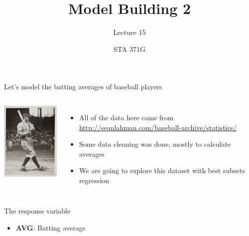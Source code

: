 \documentclass{beamer}\usepackage[]{graphicx}\usepackage[]{color}
\title{Model Building 2}
\subtitle{Lecture 15}
\author{STA 371G}
\begin{document}
  
  

  \frame{\maketitle}



  \begin{darkframes}
    
    \begin{frame}{Let's model the batting averages of baseball players}
      \begin{columns}[onlytextwidth]
          \includegraphics[width=1.6in]{TyCobb.png}
        
          \begin{itemize}
            \item All of the data here came from \url{http://seanlahman.com/baseball-archive/statistics/}
            \item Some data cleaning was done, mostly to calculate averages
            \item We are going to explore this dataset with best subsets regression
          \end{itemize}
      \end{columns}
    \end{frame}

    \begin{frame}{The response variable}
      \begin{itemize}
        \item \textbf{AVG}: Batting average
      \end{itemize}
    \end{frame}


\end{darkframes}
\end{document}

